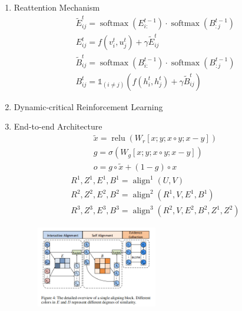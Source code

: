 \documentclass[a4paper,UTF8]{article}
\numberwithin{equation}{section}
\begin{document}
\begin{enumerate}
	\item Reattention Mechanism\\
	\begin{equation}
	\begin{array}{l}{\tilde{E}_{i j}^{t}=\operatorname{softmax}\left(E_{i :}^{t-1}\right) \cdot \operatorname{softmax}\left(B_{ : j}^{t-1}\right)} \\ {E_{i j}^{t}=f\left(v_{i}^{t}, u_{j}^{t}\right)+\gamma \tilde{E}_{i j}^{t}}\end{array}
	\end{equation}
	\begin{equation}
	\begin{array}{l}{\tilde{B}_{i j}^{t}=\operatorname{softmax}\left(B_{i :}^{t-1}\right) \cdot \operatorname{softmax}\left(B_{ : j}^{t-1}\right)} \\ {B_{i j}^{t}=\mathbb{1}_{(i \neq j)}\left(f\left(h_{i}^{t}, h_{j}^{t}\right)+\gamma \tilde{B}_{i j}^{t}\right)}\end{array}
	\end{equation}
	\item Dynamic-critical Reinforcement Learning
	\item End-to-end Architecture\\
	\begin{equation}
	\begin{array}{c}{\tilde{x}=\operatorname{relu}\left(W_{r}[x ; y ; x \circ y ; x-y]\right)} \\ {g=\sigma\left(W_{g}[x ; y ; x \circ y ; x-y]\right)} \\ {o=g \circ \tilde{x}+(1-g) \circ x}\end{array}
	\end{equation}
	\begin{equation}
	\begin{array}{c}{R^{1}, Z^{1}, E^{1}, B^{1}=\operatorname{align}^{1}(U, V)} \\ {R^{2}, Z^{2}, E^{2}, B^{2}=\operatorname{align}^{2}\left(R^{1}, V, E^{1}, B^{1}\right)} \\ {R^{3}, Z^{3}, E^{3}, B^{3}=\operatorname{align}^{3}\left(R^{2}, V, E^{2}, B^{2}, Z^{1}, Z^{2}\right)}\end{array}
	\end{equation}
	\begin{figure}[H]
		\centering
		\includegraphics[width=0.5\textwidth]{14-2.png}
	\end{figure}
\end{enumerate}
\end{document}
